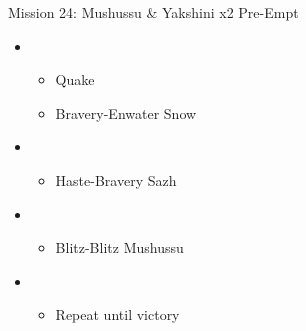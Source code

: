 \begin{multicols}{2}
  \begin{battle}[0:28]{Mission 24: Mushussu \& Yakshini x2 Pre-Empt}
    \begin{itemize}
      \item \first
            \begin{itemize}
              \item Quake
              \item Bravery-Enwater Snow
            \end{itemize}
      \item \fifth
            \begin{itemize}
              \item Haste-Bravery Sazh
            \end{itemize}
      \item \fourth
            \begin{itemize}
              \item Blitz-Blitz Mushussu
            \end{itemize}
      \item \sixth
            \begin{itemize}
              \item Repeat until victory
            \end{itemize}
    \end{itemize}
  \end{battle}


\end{multicols}
